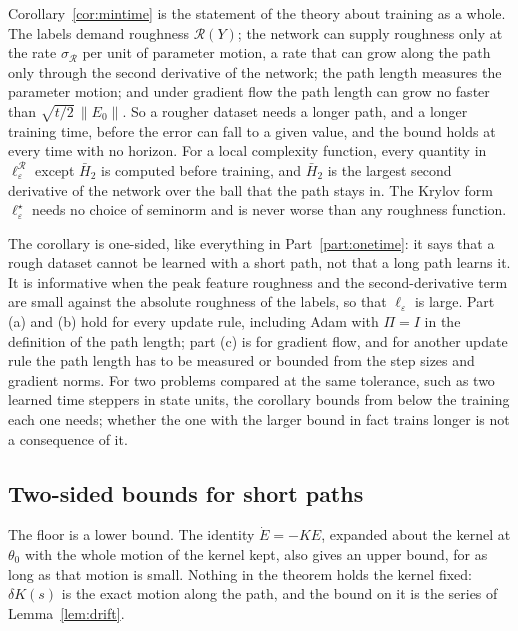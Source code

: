 \documentclass[11pt]{article}
\theoremstyle{definition}
\theoremstyle{remark}
\newcommand{\Rgh}{\mathcal{R}}           %
\newcommand{\sR}{\sigma_{\Rgh}}
\begin{document}
Corollary~\ref{cor:mintime} is the statement of the theory about training as a whole.
The labels demand roughness $\Rgh(Y)$; the network can supply roughness only at the rate $\sR$ per unit of parameter motion, a rate that can grow along the path only through the second derivative of the network; the path length measures the parameter motion; and under gradient flow the path length can grow no faster than $\sqrt{t/2}\,\|E_0\|$.
So a rougher dataset needs a longer path, and a longer training time, before the error can fall to a given value, and the bound holds at every time with no horizon.
For a local complexity function, every quantity in $\ell_\varepsilon^\Rgh$ except $\bar H_2$ is computed before training, and $\bar H_2$ is the largest second derivative of the network over the ball that the path stays in.
The Krylov form $\ell_\varepsilon^\star$ needs no choice of seminorm and is never worse than any roughness function.

The corollary is one-sided, like everything in Part~\ref{part:onetime}: it says that a rough dataset cannot be learned with a short path, not that a long path learns it.
It is informative when the peak feature roughness and the second-derivative term are small against the absolute roughness of the labels, so that $\ell_\varepsilon$ is large.
Part (a) and (b) hold for every update rule, including Adam with $\Pi = I$ in the definition of the path length; part (c) is for gradient flow, and for another update rule the path length has to be measured or bounded from the step sizes and gradient norms.
For two problems compared at the same tolerance, such as two learned time steppers in state units, the corollary bounds from below the training each one needs; whether the one with the larger bound in fact trains longer is not a consequence of it.

\subsection{Two-sided bounds for short paths}

The floor is a lower bound.
The identity $\dot E = -KE$, expanded about the kernel at $\theta_0$ with the whole motion of the kernel kept, also gives an upper bound, for as long as that motion is small.
Nothing in the theorem holds the kernel fixed: $\delta K(s)$ is the exact motion along the path, and the bound on it is the series of Lemma~\ref{lem:drift}.
\end{document}
